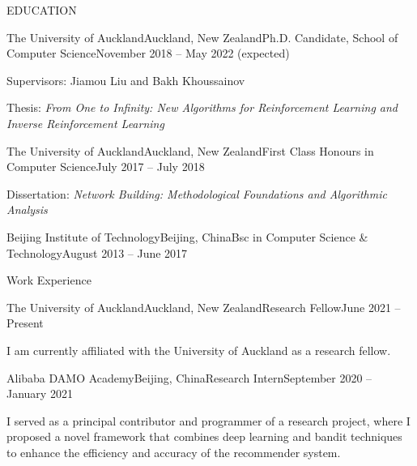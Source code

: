 \documentclass{resume} %
\begin{document}

\begin{rSection}{EDUCATION}

\begin{rSubsection}{The University of Auckland}{Auckland, New Zealand}{Ph.D. Candidate, School of Computer Science}{November 2018 -- May 2022 (expected)}%
\item Supervisors: Jiamou Liu and Bakh Khoussainov
\item Thesis: {\em From One to Infinity: New Algorithms for Reinforcement Learning and Inverse Reinforcement Learning}
\end{rSubsection}

\begin{rSubsection}{The University of Auckland}{Auckland, New Zealand}{First Class Honours in Computer Science}{July 2017 -- July 2018}
\item Dissertation: {\em Network Building: Methodological Foundations and Algorithmic Analysis}
\end{rSubsection}

\begin{rSubsection}{Beijing Institute of Technology}{Beijing, China}{Bsc in Computer Science \& Technology}{August 2013 -- June 2017}
\end{rSubsection}
\end{rSection}


\begin{rSection}{Work Experience}
\begin{rSubsection}{The University of Auckland}{Auckland, New Zealand}{Research Fellow}{June 2021 -- Present}
\item I am currently affiliated with the University of Auckland as a research fellow. %
\end{rSubsection}
	\begin{rSubsection}{Alibaba DAMO Academy}{Beijing, China}{Research Intern}{September 2020 -- January 2021}
\item I served as a principal contributor and programmer of a research project, where I proposed a novel framework that combines deep learning and bandit techniques to enhance the efficiency and accuracy of the recommender system. %
\end{rSubsection}
\end{rSection}
\end{document}

